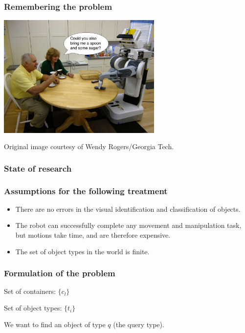 \begin{frame}
  \frametitle{Remembering the problem}
  \begin{center}
    \includegraphics[width=3.2in]{img/robot_in_kitchen.jpg}

    \tiny{Original image courtesy of Wendy Rogers/Georgia Tech.}
  \end{center}
\end{frame}

\begin{frame}
  \frametitle{State of research}
\end{frame}

\begin{frame}
  \frametitle{Assumptions for the following treatment}
  \begin{itemize}
  \item There are no errors in the visual identification and classification of objects.
  \item The robot can successfully complete any movement and manipulation task,
    but motions take time, and are therefore expensive.
  \item The set of object types in the world is finite.
  \end{itemize}
\end{frame}

\begin{frame}
  \frametitle{Formulation of the problem}
  \begin{center}
    \vspace{-0.13in}
    Set of containers: $\{c_l\}$


    Set of object types: $\{t_i\}$


    We want to find an object of type $q$ (the query type).


  \end{center}
\end{frame}

